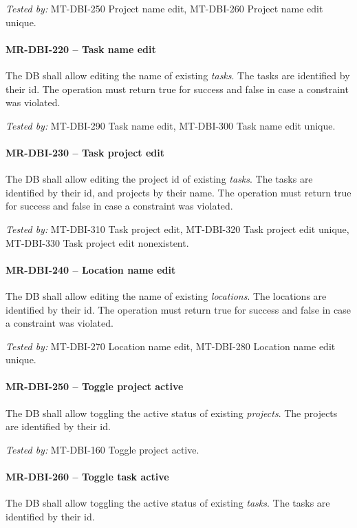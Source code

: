 \textit{Tested by: } MT-DBI-250 Project name edit,
MT-DBI-260 Project name edit unique.

\paragraph{MR-DBI-220 -- Task name edit}
The \gls{DB} shall allow editing the name of existing \emph{tasks}.
The tasks are identified by their id. The operation must return true for success
and false in case a constraint was violated.

\textit{Tested by: } MT-DBI-290 Task name edit,
MT-DBI-300 Task name edit unique.

\paragraph{MR-DBI-230 -- Task project edit}
The \gls{DB} shall allow editing the project id of existing \emph{tasks}.
The tasks are identified by their id, and projects by their name.
The operation must return true for success and false in case a
constraint was violated.

\textit{Tested by: } MT-DBI-310 Task project edit,
MT-DBI-320 Task project edit unique,
MT-DBI-330 Task project edit nonexistent.

\paragraph{MR-DBI-240 -- Location name edit}
The \gls{DB} shall allow editing the name of existing \emph{locations}.
The locations are identified by their id.
The operation must return true for success and false in case a
constraint was violated.

\textit{Tested by: } MT-DBI-270 Location name edit,
MT-DBI-280 Location name edit unique.

\paragraph{MR-DBI-250 -- Toggle project active}
The \gls{DB} shall allow toggling the active status of existing \emph{projects}.
The projects are identified by their id.

\textit{Tested by: } MT-DBI-160 Toggle project active.

\paragraph{MR-DBI-260 -- Toggle task active}
The \gls{DB} shall allow toggling the active status of existing \emph{tasks}.
The tasks are identified by their id.

